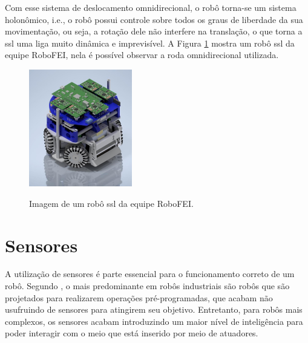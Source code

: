 \documentclass[acronym, symbols]{fei}
\begin{document}
		Com esse sistema de deslocamento omnidirecional, o robô torna-se um sistema holonômico, i.e., o robô possui controle sobre todos os graus de liberdade da sua movimentação, ou seja, a rotação dele não interfere na translação, o que torna a \acrshort{ssl} uma liga muito dinâmica e imprevisível. A Figura \ref{fig:exemplo_robo_ssl} mostra um robô \acrshort{ssl} da equipe RoboFEI, nela é possível observar a roda omnidirecional utilizada.
		
		\begin{figure}[!htb]
			\centering
			\caption{Imagem de um robô \acrshort{ssl} da equipe RoboFEI.} 
			\includegraphics[width=0.4\textwidth]{Foto_Robo_2012.jpg}
			\label{fig:exemplo_robo_ssl}
		\end{figure}
		
		
		
		
		
	\section{Sensores}
	
		A utilização de sensores é parte essencial para o funcionamento correto de um robô. Segundo \textcite{de2017tipos}, o mais predominante em robôs industriais são robôs que são projetados para realizarem operações pré-programadas, que acabam não usufruindo de sensores para atingirem seu objetivo. Entretanto, para robôs mais complexos, os sensores acabam introduzindo um maior nível de inteligência para poder interagir com o meio que está inserido por meio de atuadores.
		
\end{document}
